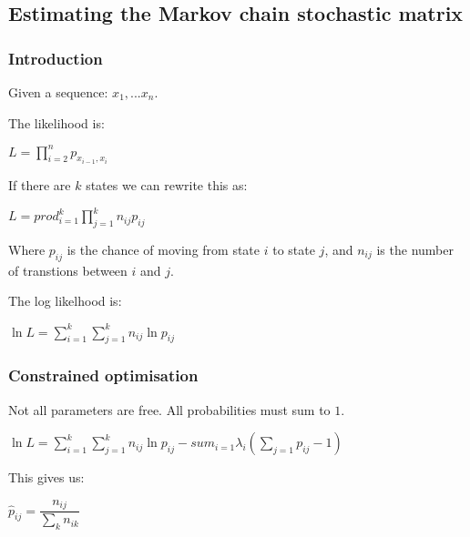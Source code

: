 
\subsection{Estimating the Markov chain stochastic matrix}

\subsubsection{Introduction}

Given a sequence: \(x_1,...x_n\).

The likelihood is:

\(L=\prod_{i=2}^n p_{x_{i-1},x_i}\)

If there are \(k\) states we can rewrite this as:

\(L=prod_{i=1}^k\prod_{j=1}^k n_{ij}p_{ij}\)

Where \(p_{ij}\) is the chance of moving from state \(i\) to state \(j\), and \(n_{ij}\) is the number of transtions between \(i\) and \(j\).

The log likelhood is:

\(\ln L=\sum_{i=1}^k\sum_{j=1}^kn_{ij}\ln p_{ij}\)

\subsubsection{Constrained optimisation}

Not all parameters are free. All probabilities must sum to \(1\).

\(\ln L=\sum_{i=1}^k\sum_{j=1}^kn_{ij}\ln p_{ij}-sum_{i=1}\lambda_i (\sum_{j=1}p_{ij}-1)\)

This gives us:

\(\hat p_{ij}=\dfrac{n_{ij}}{\sum_k n_{ik}}\)

